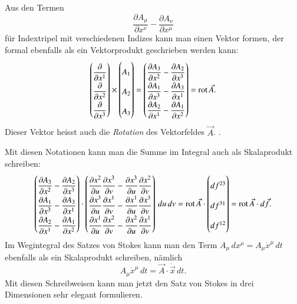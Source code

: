 Aus den Termen
\[
\frac{\partial A_\mu}{\partial x^\nu}
-
\frac{\partial A_\nu}{\partial x^\mu}
\]
für Indextripel mit verschiedenen Indizes kann man einen Vektor
formen, der formal ebenfalls als ein Vektorprodukt geschrieben
werden kann:
\[
{
\def\arraystretch{1.9}
\begin{pmatrix}
\displaystyle \frac{\partial}{\partial x^1}\\
\displaystyle \frac{\partial}{\partial x^2}\\
\displaystyle \frac{\partial}{\partial x^3}
\end{pmatrix}
}
\times
\begin{pmatrix}
A_1\\A_2\\A_3
\end{pmatrix}
=
{
\def\arraystretch{1.9}
\begin{pmatrix}
\displaystyle
\frac{\partial A_3}{\partial x^2}-\frac{\partial A_2}{\partial x^3}\\
\displaystyle
\frac{\partial A_1}{\partial x^3}-\frac{\partial A_3}{\partial x^1}\\
\displaystyle
\frac{\partial A_2}{\partial x^1}-\frac{\partial A_1}{\partial x^2}
\end{pmatrix}
}
=
\operatorname{rot}\vec A.
\]
Dieser Vektor heisst auch die {\em Rotation} des Vektorfeldes $\vec A$.
.%

Mit diesen Notationen kann man die Summe im Integral auch als Skalaprodukt
schreiben:
\[
{
\def\arraystretch{2.0}
\begin{pmatrix}
\displaystyle
\frac{\partial A_3}{\partial x^2}-\frac{\partial A_2}{\partial x^3}\\
\displaystyle
\frac{\partial A_1}{\partial x^3}-\frac{\partial A_3}{\partial x^1}\\
\displaystyle
\frac{\partial A_2}{\partial x^1}-\frac{\partial A_1}{\partial x^2}
\end{pmatrix}
\cdot
\begin{pmatrix}
\displaystyle
\frac{\partial x^2}{\partial u}\frac{\partial x^3}{\partial v}
-
\frac{\partial x^3}{\partial u}\frac{\partial x^2}{\partial v}
\\
\displaystyle
\frac{\partial x^3}{\partial u}\frac{\partial x^1}{\partial v}
-
\frac{\partial x^1}{\partial u}\frac{\partial x^3}{\partial v}
\\
\displaystyle
\frac{\partial x^1}{\partial u}\frac{\partial x^2}{\partial v}
-
\frac{\partial x^2}{\partial u}\frac{\partial x^1}{\partial v}
\end{pmatrix}
\,du\,dv
}
=
\operatorname{rot}\vec A\cdot
\begin{pmatrix}
df^{23}\\
df^{31}\\
df^{12}
\end{pmatrix}
=
\operatorname{rot}\vec A
\cdot
d\vec f.
\]
Im Wegintegral des Satzes von Stokes kann man den Term 
$A_\mu\,dx^\mu=A_\mu \dot x^\mu\,dt$ ebenfalls als ein
Skalaprodukt schreiben, nämlich
\[
A_\mu \dot x^\mu\,dt = \vec A\cdot \dot{\vec x}\,dt.
\]
Mit diesen Schreibweisen kann man jetzt den Satz von Stokes in
drei Dimensionen sehr elegant formulieren.

